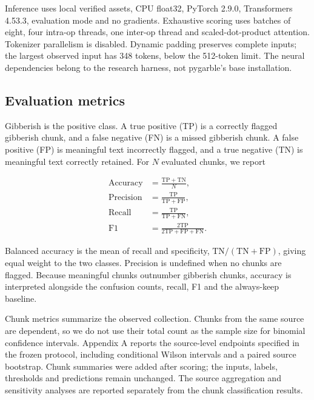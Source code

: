 \documentclass[10pt,a4paper,twocolumn]{article}
\begin{document}
Inference uses local verified assets, CPU float32, PyTorch 2.9.0,
Transformers 4.53.3, evaluation mode and no gradients. Exhaustive
scoring uses batches of eight, four intra-op threads, one inter-op
thread and scaled-dot-product attention. Tokenizer parallelism is
disabled. Dynamic padding preserves complete inputs; the largest
observed input has 348 tokens, below the 512-token limit. The neural
dependencies belong to the research harness, not pygarble's base
installation.

\subsection{Evaluation metrics}\label{evaluation-metrics}

Gibberish is the positive class. A true positive (TP) is a correctly
flagged gibberish chunk, and a false negative (FN) is a missed gibberish
chunk. A false positive (FP) is meaningful text incorrectly flagged, and
a true negative (TN) is meaningful text correctly retained. For \(N\)
evaluated chunks, we report

\begin{align}
\mathrm{Accuracy} &= \frac{\mathrm{TP}+\mathrm{TN}}{N},\\
\mathrm{Precision} &= \frac{\mathrm{TP}}{\mathrm{TP}+\mathrm{FP}},\\
\mathrm{Recall} &= \frac{\mathrm{TP}}{\mathrm{TP}+\mathrm{FN}},\\
\mathrm{F1} &= \frac{2\mathrm{TP}}{2\mathrm{TP}+\mathrm{FP}+\mathrm{FN}}.
\end{align}

Balanced accuracy is the mean of recall and specificity,
\(\mathrm{TN}/(\mathrm{TN}+\mathrm{FP})\), giving equal weight to the
two classes. Precision is undefined when no chunks are flagged. Because
meaningful chunks outnumber gibberish chunks, accuracy is interpreted
alongside the confusion counts, recall, F1 and the always-keep baseline.

Chunk metrics summarize the observed collection. Chunks from the same
source are dependent, so we do not use their total count as the sample
size for binomial confidence intervals. Appendix A reports the
source-level endpoints specified in the frozen protocol, including
conditional Wilson intervals and a paired source bootstrap. Chunk
summaries were added after scoring; the inputs, labels, thresholds and
predictions remain unchanged. The source aggregation and sensitivity
analyses are reported separately from the chunk classification results.
\end{document}
